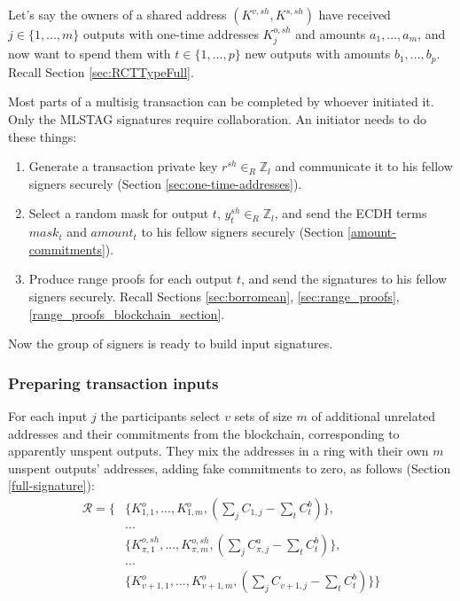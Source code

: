 Let's say the owners of a shared address $(K^{v,sh},K^{s,sh})$ have received $j \in \{1,...,m\}$ outputs with one-time addresses $K^{o,sh}_j$ and amounts $a_1,...,a_m$, and now want to spend them with $t \in \{1,...,p\}$ new outputs with amounts $b_1,...,b_p$. Recall Section \ref{sec:RCTTypeFull}.

Most parts of a multisig transaction can be completed by whoever initiated it. Only the MLSTAG signatures require collaboration. An initiator needs to do these things:

\begin{enumerate}
    \item Generate a transaction private key $r^{sh} \in_R \mathbb{Z}_l$ and communicate it to his fellow signers securely (Section \ref{sec:one-time-addresses}).
    \item Select a random mask for output $t$, $y^{sh}_{t} \in_R \mathbb{Z}_l$, and send the ECDH terms $\mathit{mask}_t$ and $\mathit{amount}_t$ to his fellow signers securely (Section \ref{amount-commitments}).
    \item Produce range proofs for each output $t$, and send the signatures to his fellow signers securely. Recall Sections \ref{sec:borromean}, \ref{sec:range_proofs}, \ref{range_proofs_blockchain_section}.%
\end{enumerate}

Now the group of signers is ready to build input signatures.

\subsubsection*{Preparing transaction inputs}

For each input $j$ the participants select $v$ sets of size $m$ of additional unrelated addresses and their commitments from the blockchain, corresponding to apparently unspent outputs.  They mix the addresses in a ring with their own $m$ unspent outputs' addresses, adding fake commitments to zero, as follows (Section \ref{full-signature}):
\begin{align*}
  \mathcal{R} = \{ &\{K_{1,1}^o,...,K_{1,m}^o, (\sum\limits_j C_{1, j} - \sum\limits_t C^b_{t})\}, \\
  &... \\
  &\{K^{o,sh}_{\pi,1},...,K^{o,sh}_{\pi,m}, (\sum\limits_j C^a_{\pi, j} - \sum\limits_t C^b_{t})\}, \\
  &... \\
  &\{K_{v+1,1}^o,...,K_{v+1,m}^o, (\sum\limits_j C_{v+1, j} - \sum\limits_t C^b_{t})\}\}
\end{align*}

